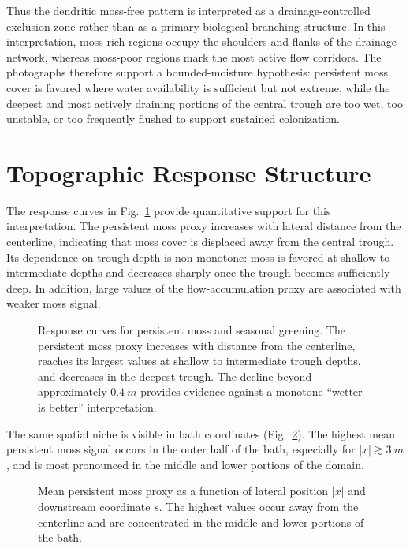 \documentclass[11pt,a4paper]{article}
\begin{document}
Thus the dendritic moss-free pattern is interpreted as a drainage-controlled
exclusion zone rather than as a primary biological branching structure. In this
interpretation, moss-rich regions occupy the shoulders and flanks of the
drainage network, whereas moss-poor regions mark the most active flow
corridors. The photographs therefore support a bounded-moisture hypothesis:
persistent moss cover is favored where water availability is sufficient but not
extreme, while the deepest and most actively draining portions of the central
trough are too wet, too unstable, or too frequently flushed to support sustained
colonization.

\section{Topographic Response Structure}

The response curves in Fig.~\ref{fig:response-curves} provide quantitative
support for this interpretation. The persistent moss proxy increases with
lateral distance from the centerline, indicating that moss cover is displaced
away from the central trough. Its dependence on trough depth is non-monotone:
moss is favored at shallow to intermediate depths and decreases sharply once the
trough becomes sufficiently deep. In addition, large values of the
flow-accumulation proxy are associated with weaker moss signal.

\begin{figure}[H]
	\centering
	\caption{Response curves for persistent moss and seasonal greening. The
		persistent moss proxy increases with distance from the centerline, reaches its
		largest values at shallow to intermediate trough depths, and decreases in the
		deepest trough. The decline beyond approximately \(\SI{0.4}{m}\) provides
		evidence against a monotone ``wetter is better'' interpretation.}
	\label{fig:response-curves}
\end{figure}

The same spatial niche is visible in bath coordinates
(Fig.~\ref{fig:zone-heatmap}). The highest mean persistent moss signal occurs
in the outer half of the bath, especially for
\(|x| \gtrsim \SI{3}{m}\), and is most pronounced in the middle and lower
portions of the domain.

\begin{figure}[H]
	\centering
	\caption{Mean persistent moss proxy as a function of lateral position
		\(|x|\) and downstream coordinate \(s\). The highest values occur away from
		the centerline and are concentrated in the middle and lower portions of the
		bath.}
	\label{fig:zone-heatmap}
\end{figure}
\end{document}
